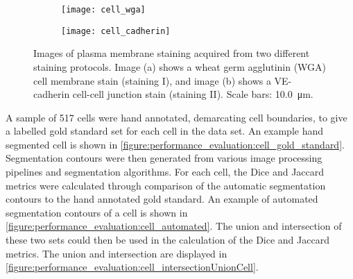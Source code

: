 \begin{figure}[htbp]\centering
	\begin{subfigure}[b]{0.49\linewidth}
		\centering
		\texttt{[image: cell\_wga]}
		\caption{}
		\label{figure:performance_evaluation:staining_1}
		\vspace{1ex}
	\end{subfigure}
	\begin{subfigure}[b]{0.49\linewidth}
		\centering
		\texttt{[image: cell\_cadherin]}
		\caption{}
		\label{figure:performance_evaluation:staining_2}
		\vspace{1ex}
	\end{subfigure}
\caption[Cell staining protocols]{Images of plasma membrane staining acquired from two different staining protocols. Image (a) shows a wheat germ agglutinin (WGA) cell membrane stain (staining I), and image (b) shows a VE-cadherin cell-cell junction stain (staining II). Scale bars: \SI{10.0}{\micro\meter}.}
\label{figure:performance_evaluation:staining}
\end{figure}

A sample of 517 cells were hand annotated, demarcating cell boundaries, to give a labelled gold standard set for each cell in the data set. An example hand segmented cell is shown in \autoref{figure:performance_evaluation:cell_gold_standard}. Segmentation contours were then generated from various image processing pipelines and segmentation algorithms. For each cell, the Dice and Jaccard metrics were calculated through comparison of the automatic segmentation contours to the hand annotated gold standard. An example of automated segmentation contours of a cell is shown in \autoref{figure:performance_evaluation:cell_automated}. The union and intersection of these two sets could then be used in the calculation of the Dice and Jaccard metrics. The union and intersection are displayed in \autoref{figure:performance_evaluation:cell_intersectionUnionCell}.

